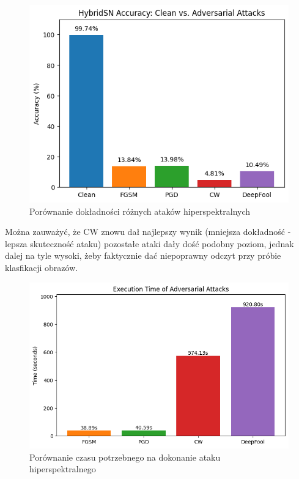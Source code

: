 \documentclass{article}
\begin{document}
\begin{figure}[H]
    \centering
    \includegraphics[width=1\textwidth]{hybridsn_accuracy.png} 
    \caption{Porównanie dokładności różnych ataków hiperspektralnych}
\end{figure}

Można zauważyć, że CW znowu dał najlepszy wynik (mniejsza dokładność - lepsza skuteczność ataku) pozostałe ataki dały dość podobny poziom, jednak dalej na tyle wysoki, żeby faktycznie dać niepoprawny odczyt przy próbie klasfikacji obrazów.

\begin{figure}[H]
    \centering
    \includegraphics[width=1\textwidth]{hybridsn_time.png} 
    \caption{Porównanie czasu potrzebnego na dokonanie ataku hiperspektralnego}
\end{figure}
\end{document}
